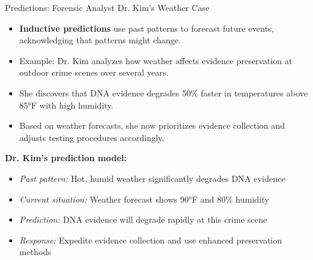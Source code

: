 \documentclass{beamer}
\begin{document}
\begin{frame}{Predictions: Forensic Analyst Dr. Kim's Weather Case}
	\begin{itemize}
		\item \textbf{Inductive predictions} use past patterns to forecast future events, acknowledging that patterns might change.
		\item Example: Dr. Kim analyzes how weather affects evidence preservation at outdoor crime scenes over several years.
		\item She discovers that DNA evidence degrades 50\% faster in temperatures above 85°F with high humidity.
		\item Based on weather forecasts, she now prioritizes evidence collection and adjusts testing procedures accordingly.
	\end{itemize}
	
	\begin{example}
		\scriptsize
		\textbf{Dr. Kim's prediction model:}
		\begin{itemize}
			\item \textit{Past pattern:} Hot, humid weather significantly degrades DNA evidence
			\item \textit{Current situation:} Weather forecast shows 90°F and 80\% humidity
			\item \textit{Prediction:} DNA evidence will degrade rapidly at this crime scene
			\item \textit{Response:} Expedite evidence collection and use enhanced preservation methods
		\end{itemize}
	\end{example}
\end{frame}	
\end{document}
